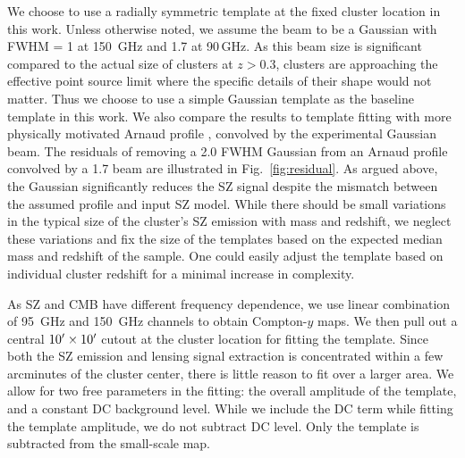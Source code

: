 We choose to use a radially symmetric template at the fixed cluster location in this work. 
Unless otherwise noted, we assume the beam to be a Gaussian with FWHM = 1\arcmin{} at 150\, GHz and 1\arcmin.7 at 90\,GHz. 
As this beam size is significant compared to the actual size of clusters at $z>0.3$, clusters are approaching the effective point source limit where the specific details of their shape would not matter. 
Thus we choose to use a simple Gaussian template as the baseline template in this work. 
We also compare the results to template fitting with more physically motivated Arnaud profile \citep{arnaud10}, convolved by the experimental Gaussian beam.  
The residuals of removing a 2\arcmin.0 FWHM Gaussian from an Arnaud profile convolved by a 1\arcmin.7 beam are illustrated in Fig.~\ref{fig:residual}. 
As argued above, the Gaussian significantly reduces the SZ signal despite the mismatch between the assumed profile and input SZ model. 
While there should be small variations in the typical size of the cluster's SZ emission with mass and redshift, we neglect these variations and fix the size of the templates based on the expected median mass and redshift of the sample. 
One could easily adjust the template based on individual cluster redshift for a minimal increase in complexity.



As SZ and CMB have different frequency dependence, we use linear combination of 95\, GHz and 150\, GHz channels to obtain Compton-$y$ maps.
We then pull out a central $10^{\prime} \times 10^{\prime}$ cutout at the cluster location for fitting the template. 
Since both the SZ emission and lensing signal extraction is concentrated within a few arcminutes of the cluster center, there is little reason to fit over a larger area. 
We allow for two free parameters in the fitting: the overall amplitude of the template, and a constant DC background level. 
While we include the DC term while fitting the template amplitude, we do not subtract DC level. 
Only the template is subtracted from the small-scale map.



